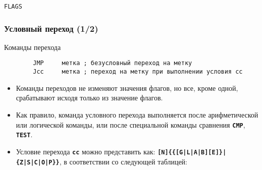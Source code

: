 \documentclass[pdf,9pt,aspectratio=169]{beamer}
\newcommand{\cl}[1]{\texttt{\bf #1}}
\begin{document}
\begin{frame}[fragile]
\begin{block}{\texttt{FLAGS}}
\begin{center}
    \end{center}
  \end{block}
\end{frame}

\begin{frame}[fragile]\frametitle{Условный переход (1/2)}
  \begin{block}{Команды перехода}
    \begin{verbatim}
        JMP     метка ; безусловный переход на метку
        Jcc     метка ; переход на метку при выполнении условия сс
    \end{verbatim}
  \end{block}
  \begin{block}{}
    \begin{itemize}
      \item Команды переходов не изменяют значения флагов, но все, кроме одной, срабатывают исходя только из значение флагов.
      \item Как правило, команда условного перехода выполняется после арифметической или логической команды, или после специальной команды сравнения \cl{CMP}, \cl{TEST}.
      \item Условие перехода \cl{сс} можно представить как: \cl{[N]\{\{[G|L|A|B][E]\}|\{Z|S|C|O|P\}\}}, в соответствии со следующей таблицей:
    \end{itemize}
  \end{block}
\end{frame}
\end{document}
